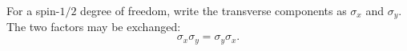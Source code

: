 \documentclass{article}
\begin{document}
For a spin-$1/2$ degree of freedom, write the transverse components as
$\sigma_x$ and $\sigma_y$.  The two factors may be exchanged:
\begin{equation}
\sigma_x\sigma_y = \sigma_y\sigma_x .
\label{eq:transverse-exchange}
\end{equation}
\end{document}
